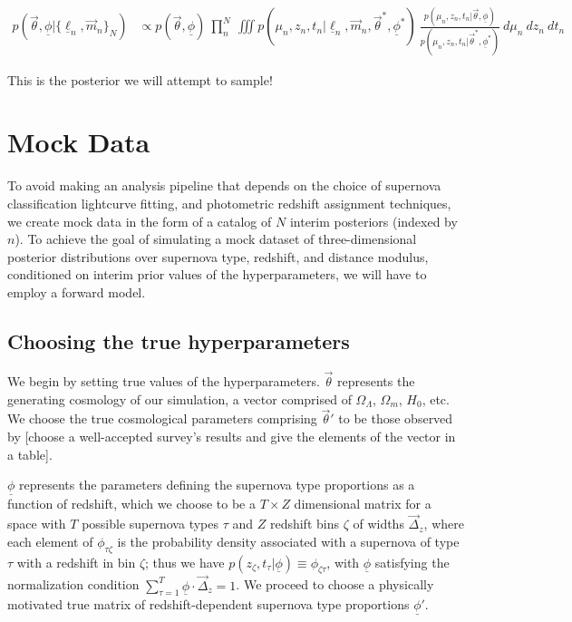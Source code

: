 \documentclass[12pt, onecolumn]{emulateapj}
\newcommand{\textul}{\underline}
\begin{document}
\begin{align}
p(\vec{\theta}, \textul{\phi} | \{\textul{\ell}_{n}, \vec{m}_{n}\}_{N}) &\propto p(\vec{\theta}, \textul{\phi})\ \prod_{n}^{N}\ \iiint p(\mu_{n}, z_{n}, t_{n} | \textul{\ell}_{n}, \vec{m}_{n}, \vec{\theta}^{*}, \textul{\phi}^{*})\ \frac{p(\mu_{n}, z_{n}, t_{n} | \vec{\theta}, \textul{\phi})}{p(\mu_{n}, z_{n}, t_{n} | \vec{\theta}^{*}, \textul{\phi}^{*})}\ d\mu_{n}\ dz_{n}\ dt_{n}
\end{align}

This is the posterior we will attempt to sample!

\section{Mock Data}
\label{sec:data}

To avoid making an analysis pipeline that depends on the choice of supernova classification lightcurve fitting, and photometric redshift assignment techniques, we create mock data in the form of a catalog of $N$ interim posteriors (indexed by $n$).  To achieve the goal of simulating a mock dataset of three-dimensional posterior distributions over supernova type, redshift, and distance modulus, conditioned on interim prior values of the hyperparameters, we will have to employ a forward model.

\subsection{Choosing the true hyperparameters}
\label{sec:true_hypers}

We begin by setting true values of the hyperparameters.  $\vec{\theta}$ represents the generating cosmology of our simulation, a vector comprised of $\Omega_{\Lambda}$, $\Omega_{m}$, $H_{0}$, etc.  We choose the true cosmological parameters comprising $\vec{\theta}'$ to be those observed by [choose a well-accepted survey's results and give the elements of the vector in a table].  

$\textul{\phi}$ represents the parameters defining the supernova type proportions as a function of redshift, which we choose to be a $T\times Z$ dimensional matrix for a space with $T$ possible supernova types $\tau$ and $Z$ redshift bins $\zeta$ of widths $\vec{\Delta}_{z}$, where each element of $\phi_{\tau\zeta}$ is the probability density associated with a supernova of type $\tau$ with a redshift in bin $\zeta$; thus we have $p(z_{\zeta}, t_{\tau} | \textul{\phi}) \equiv \phi_{\zeta\tau}$, with $\textul{\phi}$ satisfying the normalization condition $\sum_{\tau=1}^{T}\textul{\phi}\cdot\vec{\Delta}_{z}=1$.  We proceed to choose a physically motivated true matrix of redshift-dependent supernova type proportions $\textul{\phi}'$.
\end{document}
